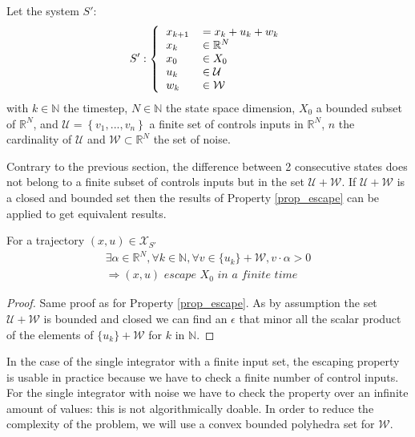 Let the system $S'$:
\begin{equation}
S':\left \{
  \begin{tabular}{ll}
  $x_{k+1}$ &$= x_k + u_k + w_k$\\
  $x_k$ & $\in \mathbb{R}^N$\\
  $x_0$ & $\in X_0$\\
  $u_k$ & $\in \mathcal{U}$\\
  $w_k$ & $\in \mathcal{W}$
  \end{tabular}
\right.
\end{equation}
with $k \in \mathbb{N}$ the timestep, $N \in \mathbb{N}$ the state space dimension, $X_0$ a bounded subset of $\mathbb{R}^N$, and $\mathcal{U} = \left \{v_1,...,v_n \right \}$ a finite set of controls inputs in $\mathbb{R}^N$, $n$ the cardinality of $\mathcal{U}$ and $\mathcal{W} \subset \mathbb{R}^N$ the set of noise.

Contrary to the previous section, the difference between 2 consecutive states does not belong to a finite subset of controls inputs but in the set $\mathcal{U} + \mathcal{W}$.
If $\mathcal{U} + \mathcal{W}$ is a closed and bounded set then the results of Property \ref{prop_escape} can be applied to get equivalent results.

\begin{property} \label{prop_escape_noise}
For a trajectory $(x,u) \in \mathcal{X}_{S'}$ 
\begin{equation}
\begin{split}
\exists \alpha \in \mathbb{R}^N,
\forall k \in \mathbb{N},
\forall v \in \{u_k\} + \mathcal{W}, v \cdot \alpha > 0 \\
\Rightarrow
(x,u) \textit{ escape } X_0 \textit{ in a finite time} 
\end{split}
\end{equation}
\end{property}

\begin{proof}
Same proof as for Property \ref{prop_escape}. As by assumption the set $\mathcal{U} + \mathcal{W}$ is bounded and closed we can find an $\epsilon$ that minor all the scalar product of the elements of $\{u_k\} + \mathcal{W}$ for $k$ in $\mathbb{N}$.
\end{proof}

In the case of the single integrator with a finite input set, the escaping property is usable in practice because we have to check a finite number of control inputs.
For the single integrator with noise we have to check the property over an infinite amount of values: this is not algorithmically doable.
In order to reduce the complexity of the problem, we will use a convex bounded polyhedra set for $\mathcal{W}$.

